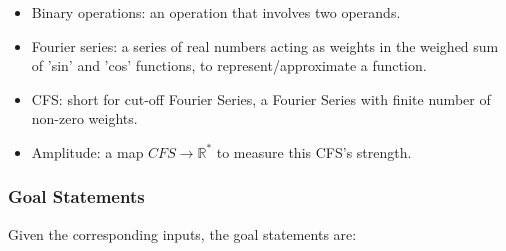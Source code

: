 \documentclass[12pt]{article}
\begin{document}
\begin{itemize}
	
	\item Binary operations: an operation that involves two operands.
	\item Fourier series: a series of real numbers acting as weights in the weighed
	sum of 'sin' and 'cos' functions, to represent/approximate a function.
	\item CFS: short for cut-off Fourier Series, a Fourier Series with finite number of non-zero weights.
	\item Amplitude: a map $\mathit{CFS}\rightarrow \mathbb{R}^{*}$ to measure this CFS's strength.
\end{itemize}
  


\subsubsection{Goal Statements}

\noindent Given the corresponding inputs, the goal statements are:
\end{document}
